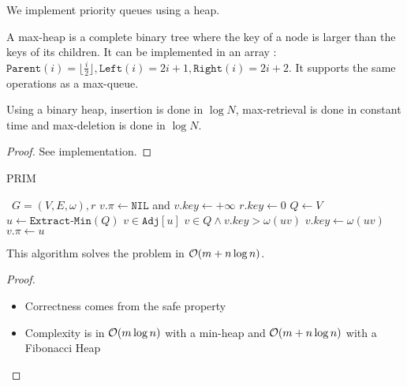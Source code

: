 \documentclass{cours}
\begin{document}
        We implement priority queues using a heap.
        \begin{definition}
            A max-heap is a complete binary tree where the key of a node is larger than the keys of its children. It can be implemented in an array : $\texttt{Parent}(i) = \lfloor \frac{i}{2}\rfloor, \texttt{Left}(i) = 2 i + 1, \texttt{Right}(i) = 2i + 2$. It supports the same operations as a max-queue.
        \end{definition}

        \begin{theorem}
            Using a binary heap, insertion is done in $\log N$, max-retrieval is done in constant time and max-deletion is done in $\log N$.
        \end{theorem}
        \begin{proof}
            See implementation.
        \end{proof}

        \begin{algorithm}
            \caption{PRIM}
            \begin{algorithmic}
                \Input \ $G = \left(V, E, \omega\right), r$
                \EndInput
                    \State $v.\pi \gets \texttt{NIL}$ and $v.key \gets + \infty$
                \EndFor
                \State $r.key \gets 0$
                \State $Q \gets V$
                    \State $u \gets \texttt{Extract-Min}(Q)$
                    \For $v \in \texttt{Adj}[u]$ 
                        \If $v \in Q \wedge v.key > \omega(uv)$
                            \State $v.key \gets \omega(uv)$
                            \State $v.\pi \gets u$
                        \EndIf
                    \EndFor
                \EndWhile
            \end{algorithmic}
        \end{algorithm}

        \begin{theorem}
            This algorithm solves the problem in $\mathcal{O}(m + n\log n)$.
        \end{theorem}

        \begin{proof}
            \begin{itemize}
                \item Correctness comes from the safe property
                \item Complexity is in $\mathcal{O}(m\log n)$ with a min-heap and $\mathcal{O}(m + n\log n)$ with a Fibonacci Heap
            \end{itemize}
        \end{proof}
\end{document}
